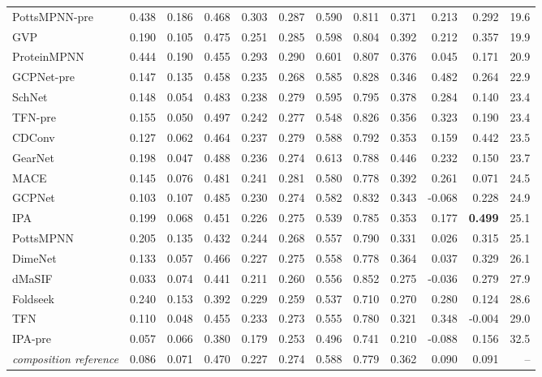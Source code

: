 \begin{longtable}{lrrrrrrrrrrr}
PottsMPNN-pre & 0.438 & 0.186 & 0.468 & 0.303 & 0.287 & 0.590 & 0.811 & 0.371 & 0.213 & 0.292 & 19.6 \\
GVP & 0.190 & 0.105 & 0.475 & 0.251 & 0.285 & 0.598 & 0.804 & 0.392 & 0.212 & 0.357 & 19.9 \\
ProteinMPNN & 0.444 & 0.190 & 0.455 & 0.293 & 0.290 & 0.601 & 0.807 & 0.376 & 0.045 & 0.171 & 20.9 \\
GCPNet-pre & 0.147 & 0.135 & 0.458 & 0.235 & 0.268 & 0.585 & 0.828 & 0.346 & 0.482 & 0.264 & 22.9 \\
SchNet & 0.148 & 0.054 & 0.483 & 0.238 & 0.279 & 0.595 & 0.795 & 0.378 & 0.284 & 0.140 & 23.4 \\
TFN-pre & 0.155 & 0.050 & 0.497 & 0.242 & 0.277 & 0.548 & 0.826 & 0.356 & 0.323 & 0.190 & 23.4 \\
CDConv & 0.127 & 0.062 & 0.464 & 0.237 & 0.279 & 0.588 & 0.792 & 0.353 & 0.159 & 0.442 & 23.5 \\
GearNet & 0.198 & 0.047 & 0.488 & 0.236 & 0.274 & 0.613 & 0.788 & 0.446 & 0.232 & 0.150 & 23.7 \\
MACE & 0.145 & 0.076 & 0.481 & 0.241 & 0.281 & 0.580 & 0.778 & 0.392 & 0.261 & 0.071 & 24.5 \\
GCPNet & 0.103 & 0.107 & 0.485 & 0.230 & 0.274 & 0.582 & 0.832 & 0.343 & -0.068 & 0.228 & 24.9 \\
IPA & 0.199 & 0.068 & 0.451 & 0.226 & 0.275 & 0.539 & 0.785 & 0.353 & 0.177 & \textbf{0.499} & 25.1 \\
PottsMPNN & 0.205 & 0.135 & 0.432 & 0.244 & 0.268 & 0.557 & 0.790 & 0.331 & 0.026 & 0.315 & 25.1 \\
DimeNet & 0.133 & 0.057 & 0.466 & 0.227 & 0.275 & 0.558 & 0.778 & 0.364 & 0.037 & 0.329 & 26.1 \\
dMaSIF & 0.033 & 0.074 & 0.441 & 0.211 & 0.260 & 0.556 & 0.852 & 0.275 & -0.036 & 0.279 & 27.9 \\
Foldseek & 0.240 & 0.153 & 0.392 & 0.229 & 0.259 & 0.537 & 0.710 & 0.270 & 0.280 & 0.124 & 28.6 \\
TFN & 0.110 & 0.048 & 0.455 & 0.233 & 0.273 & 0.555 & 0.780 & 0.321 & 0.348 & -0.004 & 29.0 \\
IPA-pre & 0.057 & 0.066 & 0.380 & 0.179 & 0.253 & 0.496 & 0.741 & 0.210 & -0.088 & 0.156 & 32.5 \\
\midrule
\textit{composition reference} & 0.086 & 0.071 & 0.470 & 0.227 & 0.274 & 0.588 & 0.779 & 0.362 & 0.090 & 0.091 & -- \\

\end{longtable}
\endgroup
